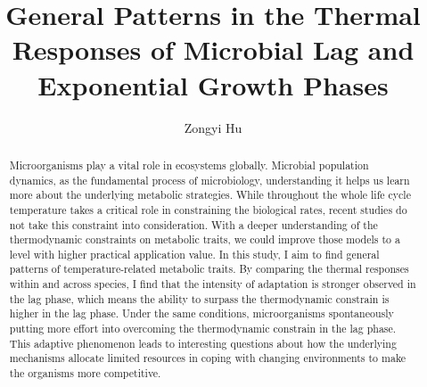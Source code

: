 \documentclass[a4paper]{article}
\title{\vspace{3em}General Patterns in the Thermal \vspace{+1.7em} Responses of Microbial Lag and Exponential Growth Phases}
\author{Zongyi Hu}
\begin{document}

 
\linenumbers

\begin{abstract}

Microorganisms play a vital role in ecosystems globally. Microbial population dynamics, as the fundamental process of microbiology, understanding it helps us learn more about the underlying metabolic strategies. While throughout the whole life cycle temperature takes a critical role in constraining the biological rates, recent studies do not take this constraint into consideration. With a deeper understanding of the thermodynamic constraints on metabolic traits, we could improve those models to a level with higher practical application value. In this study, I aim to find general patterns of temperature-related metabolic traits. By comparing the thermal responses within and across species, I find that the intensity of adaptation is stronger observed in the lag phase, which means the ability to surpass the thermodynamic constrain is higher in the lag phase. Under the same conditions, microorganisms spontaneously putting more effort into overcoming the thermodynamic constrain in the lag phase. This adaptive phenomenon leads to interesting questions about how the underlying mechanisms allocate limited resources in coping with changing environments to make the organisms more competitive.\\

\end{abstract}



\newpage
\tableofcontents

\newpage
\thispagestyle{empty}
\listoffigures
\listoftables
\clearpage
{}


\newpage
\end{document}

